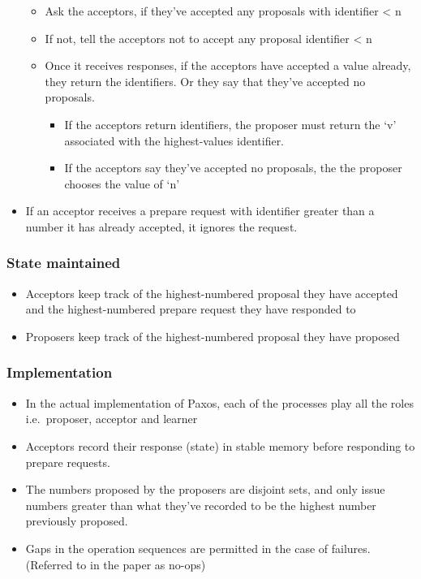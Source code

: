 \documentclass[a4paper]{article}
\begin{document}
\begin{itemize}
    \begin{itemize}
        \item
        Ask the acceptors, if they've accepted any proposals with identifier
        \textless{} n
    \item
        If not, tell the acceptors not to accept any proposal identifier
        \textless{} n
    \item
        Once it receives responses, if the acceptors have accepted a value
        already, they return the identifiers. Or they say that they've
        accepted no proposals.

        \begin{itemize}
                \item
            If the acceptors return identifiers, the proposer must return the
            `v' associated with the highest-values identifier.
        \item
            If the acceptors say they've accepted no proposals, the the
            proposer chooses the value of `n'
        \end{itemize}
    \end{itemize}
\item
    If an acceptor receives a prepare request with identifier greater than
    a number it has already accepted, it ignores the request.
\end{itemize}

\subsubsection{State maintained}

\begin{itemize}
\item
    Acceptors keep track of the highest-numbered proposal they have
    accepted and the highest-numbered prepare request they have responded
    to
\item
    Proposers keep track of the highest-numbered proposal they have
    proposed
\end{itemize}

\subsubsection{Implementation}

\begin{itemize}
\item
    In the actual implementation of Paxos, each of the processes play all
    the roles i.e.~proposer, acceptor and learner
\item
    Acceptors record their response (state) in stable memory before
    responding to prepare requests.
\item
    The numbers proposed by the proposers are disjoint sets, and only
    issue numbers greater than what they've recorded to be the highest
    number previously proposed.
\item
    Gaps in the operation sequences are permitted in the case of failures.
    (Referred to in the paper as no-ops)
\end{itemize}
\end{document}
